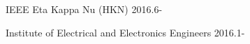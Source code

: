 

\begin{cvaffils}

    \cvaffil
    {IEEE Eta Kappa Nu (HKN)} %
    {2016.6-} %
    
        \cvaffil
    {Institute of Electrical and Electronics Engineers} %
    {2016.1-} %
    
    

\end{cvaffils}
